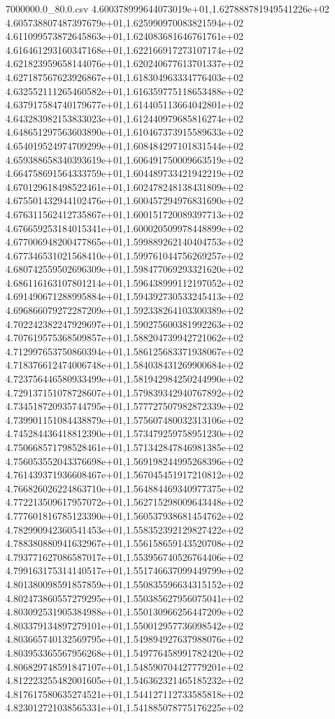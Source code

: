 \begin{filecontents*}{7000000.0_80.0.csv}
4.600378999644073019e+01,1.627888781949541226e+02
4.605738807487397679e+01,1.625990970083821594e+02
4.611099573872645863e+01,1.624083681646761761e+02
4.616461293160347168e+01,1.622166917273107174e+02
4.621823959658144076e+01,1.620240677613701337e+02
4.627187567623926867e+01,1.618304963334776403e+02
4.632552111265460582e+01,1.616359775118653488e+02
4.637917584740179677e+01,1.614405113664042801e+02
4.643283982153833023e+01,1.612440979685816274e+02
4.648651297563603890e+01,1.610467373915589633e+02
4.654019524974709299e+01,1.608484297101831544e+02
4.659388658340393619e+01,1.606491750009663519e+02
4.664758691564333759e+01,1.604489733421942219e+02
4.670129618498522461e+01,1.602478248138431809e+02
4.675501432944102476e+01,1.600457294976831690e+02
4.676311562412735867e+01,1.600151720089397713e+02
4.676659253184015341e+01,1.600020509978448899e+02
4.677006948200477865e+01,1.599889262140404753e+02
4.677346531021568410e+01,1.599761044756269257e+02
4.680742559502696309e+01,1.598477069293321620e+02
4.686116163107801214e+01,1.596438999112197052e+02
4.691490671288995884e+01,1.594392730533245413e+02
4.696866079272287209e+01,1.592338264103300389e+02
4.702242382247929697e+01,1.590275600381992263e+02
4.707619575368509857e+01,1.588204739942721062e+02
4.712997653750860394e+01,1.586125683371938067e+02
4.718376612474006748e+01,1.584038431269900684e+02
4.723756446580933499e+01,1.581942984250244990e+02
4.729137151078728607e+01,1.579839342940767892e+02
4.734518720935744795e+01,1.577727507982872339e+02
4.739901151084438879e+01,1.575607480032313106e+02
4.745284436418812390e+01,1.573479259758951230e+02
4.750668571798528461e+01,1.571342847846981385e+02
4.756053552043376698e+01,1.569198244995268396e+02
4.761439371936608467e+01,1.567045451917210812e+02
4.766826026224863710e+01,1.564884469340977375e+02
4.772213509617957072e+01,1.562715298009643448e+02
4.777601816785123390e+01,1.560537938681454762e+02
4.782990942360541453e+01,1.558352392129827422e+02
4.788380880941632967e+01,1.556158659143520708e+02
4.793771627086587017e+01,1.553956740526764406e+02
4.799163175314140517e+01,1.551746637099449799e+02
4.801380098591857859e+01,1.550835596634315152e+02
4.802473860557279295e+01,1.550385627956075041e+02
4.803092531905384988e+01,1.550130966256447209e+02
4.803379134897279101e+01,1.550012957736098542e+02
4.803665740132569795e+01,1.549894927637988076e+02
4.803953365567956268e+01,1.549776458991782420e+02
4.806829748591847107e+01,1.548590704427779201e+02
4.812223255482001605e+01,1.546362321465185232e+02
4.817617580635274521e+01,1.544127112733585818e+02
4.823012721038565331e+01,1.541885078775176225e+02

\end{filecontents*}

